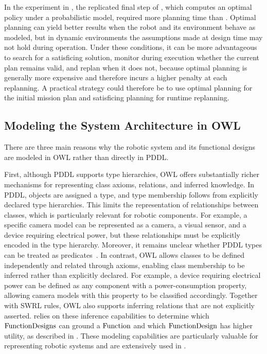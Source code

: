 In the experiment in , the replicated final step of \CamaraApproach, which computes an optimal policy under a probabilistic model, required more planning time than \planta. Optimal planning can yield better results when the robot and its environment behave as modeled, but in dynamic environments the assumptions made at design time may not hold during operation. Under these conditions, it can be more advantageous to search for a satisficing solution, monitor during execution whether the current plan remains valid, and replan when it does not, because optimal planning is generally more expensive and therefore incurs a higher penalty at each replanning. A practical strategy could therefore be to use optimal planning for the initial mission plan and satisficing planning for runtime replanning.

\subsection{Modeling the System Architecture in OWL}
There are three main reasons why the robotic system and its functional designs are modeled in OWL rather than directly in PDDL\@.

First, although PDDL supports type hierarchies, OWL offers substantially richer mechanisms for representing class axioms, relations, and inferred knowledge. In PDDL, objects are assigned a type, and type membership follows from explicitly declared type hierarchies. This limits the representation of relationships between classes, which is particularly relevant for robotic components. For example, a specific camera model can be represented as a camera, a visual sensor, and a device requiring electrical power, but these relationships must be explicitly encoded in the type hierarchy. Moreover, it remains unclear whether PDDL types can be treated as predicates~\cite{GOLDMANpddlTypeProblems2012}. In contrast, OWL allows classes to be defined independently and related through axioms, enabling class membership to be inferred rather than explicitly declared. For example, a device requiring electrical power can be defined as any component with a power-consumption property, allowing camera models with this property to be classified accordingly. Together with SWRL rules, OWL also supports inferring relations that are not explicitly asserted. \planta relies on these inference capabilities to determine which $\operatorname{FunctionDesigns}$ can ground a $\operatorname{Function}$ and which $\operatorname{FunctionDesign}$ has higher utility, as described in . These modeling capabilities are particularly valuable for representing robotic systems and are extensively used in \planta. %

